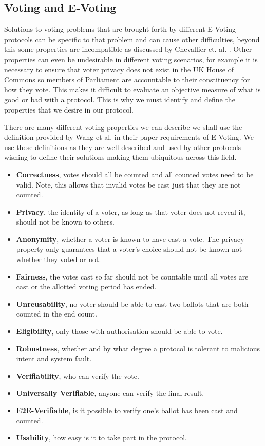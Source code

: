 \documentclass{entcs}
\begin{document}
\subsection{Voting and E-Voting} \label{sec: voting}
Solutions to voting problems that are brought forth by different E-Voting protocols can be specific to that problem and can cause other difficulties, beyond this some properties are incompatible as discussed by Chevallier et. al. \cite{Chevallier-mames06onsome}. Other properties can even be undesirable in different voting scenarios, for example it is necessary to ensure that voter privacy does not exist in the UK House of Commons so members of Parliament are accountable to their constituency for how they vote. This makes it difficult to evaluate an objective measure of what is good or bad with a protocol. This is why we must identify and define the properties that we desire in our protocol.

There are many different voting properties we can describe we shall use the definition provided by Wang et al. \cite{RequirementOfEVoting} in their paper requirements of E-Voting. We use these definitions as they are well described and used by other protocols wishing to define their solutions making them ubiquitous across this field.
\begin{itemize}
  \item {\bfseries Correctness}, votes should all be counted and all counted votes need to be valid. Note, this allows that invalid votes be cast just that they are not counted.
  \item {\bfseries Privacy}, the identity of a voter, as long as that voter does not reveal it, should not be known to others.
  \item {\bfseries Anonymity}, whether a voter is known to have cast a vote. The privacy property only guarantees that a voter's choice should not be known not whether they voted or not.
  \item {\bfseries Fairness}, the votes cast so far should not be countable until all votes are cast or the allotted voting period has ended.
  \item {\bfseries Unreusability}, no voter should be able to cast two ballots that are both counted in the end count.
  \item {\bfseries Eligibility}, only those with authorisation should be able to vote.
  \item {\bfseries Robustness}, whether and by what degree a protocol is tolerant to malicious intent and system fault.
  \item {\bfseries Verifiability}, who can verify the vote.
  \item {\bfseries Universally Verifiable}, anyone can verify the final result. 
  \item {\bfseries E2E-Verifiable}, is it possible to verify one's ballot has been cast and counted.
  \item {\bfseries Usability}, how easy is it to take part in the protocol.
\end{itemize}
\end{document}
